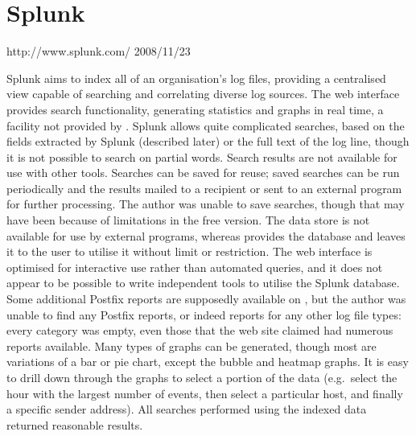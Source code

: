 \section{Splunk}

\label{Splunk review}

{http://www.splunk.com/}
{2008/11/23}

Splunk aims to index all of an organisation's log files, providing a
centralised view capable of searching and correlating diverse log sources.
The web interface provides search functionality, generating statistics and
graphs in real time, a facility not provided by \parsername{}.  Splunk
allows quite complicated searches, based on the fields extracted by Splunk
(described later) or the full text of the log line, though it is not
possible to search on partial words.  Search results are not available for
use with other tools.  Searches can be saved for reuse; saved searches can
be run periodically and the results mailed to a recipient or sent to an
external program for further processing.  The author was unable to save
searches, though that may have been because of limitations in the free
version.  The data store is not available for use by external programs,
whereas \parsername{} provides the database and leaves it to the user to
utilise it without limit or restriction.  The web interface is optimised
for interactive use rather than automated queries, and it does not appear
to be possible to write independent tools to utilise the Splunk database.
Some additional Postfix reports are supposedly available on
, but the author was
unable to find any Postfix reports, or indeed reports for any other log
file types: every category was empty, even those that the web site claimed
had numerous reports available.  Many types of graphs can be generated,
though most are variations of a bar or pie chart, except the bubble and
heatmap graphs.  It is easy to drill down through the graphs to select a
portion of the data (e.g.\ select the hour with the largest number of
events, then select a particular host, and finally a specific sender
address).  All searches performed using the indexed data returned
reasonable results.


